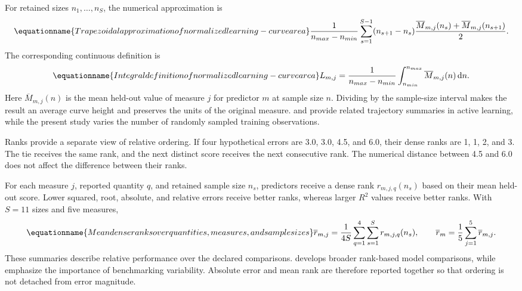 For retained sizes \(n_1,\ldots,n_S\), the numerical approximation is
\begin{equation}
\equationname{Trapezoidal approximation of normalized learning-curve area}
\label{eq:icsor_learning_area_trapezoids}
\frac{1}{n_{max}-n_{min}}
\sum_{s=1}^{S-1}(n_{s+1}-n_s)
\frac{\overline M_{m,j}(n_s)+\overline M_{m,j}(n_{s+1})}{2}.
\end{equation}
The corresponding continuous definition is
\begin{equation}
\equationname{Integral definition of normalized learning-curve area}
\label{eq:icsor_learning_area}
L_{m,j}=\frac{1}{n_{max}-n_{min}}
\int_{n_{min}}^{n_{max}}\overline M_{m,j}(n)\,\mathrm{d}n.
\end{equation}
Here \(\overline M_{m,j}(n)\) is the mean held-out value of measure \(j\) for predictor \(m\) at sample size \(n\). Dividing by the sample-size interval makes the result an average curve height and preserves the units of the original measure. \citet{Cawley2011} and \citet{Guyon2011} provide related trajectory summaries in active learning, while the present study varies the number of randomly sampled training observations.

Ranks provide a separate view of relative ordering. If four hypothetical errors are 3.0, 3.0, 4.5, and 6.0, their dense ranks are 1, 1, 2, and 3. The tie receives the same rank, and the next distinct score receives the next consecutive rank. The numerical distance between 4.5 and 6.0 does not affect the difference between their ranks.

For each measure \(j\), reported quantity \(q\), and retained sample size \(n_s\), predictors receive a dense rank \(r_{m,j,q}(n_s)\) based on their mean held-out score. Lower squared, root, absolute, and relative errors receive better ranks, whereas larger \(R^2\) values receive better ranks. With \(S=11\) sizes and five measures,
\begin{equation}
\equationname{Mean dense ranks over quantities, measures, and sample sizes}
\label{eq:icsor_dense_rank}
\overline r_{m,j}=\frac{1}{4S}\sum_{q=1}^{4}\sum_{s=1}^{S}r_{m,j,q}(n_s),
\qquad
\overline r_m=\frac{1}{5}\sum_{j=1}^{5}\overline r_{m,j}.
\end{equation}
These summaries describe relative performance over the declared comparisons. \citet{Demsar2006} develops broader rank-based model comparisons, while \citet{Shevchenko2024} emphasize the importance of benchmarking variability. Absolute error and mean rank are therefore reported together so that ordering is not detached from error magnitude.

